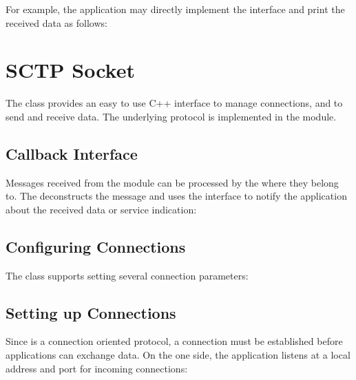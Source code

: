 For example, the application may directly implement the
 interface and print the received data as
follows:


\section{SCTP Socket}
\label{sec:sockets:sctp-socket}

The  class provides an easy to use C++ interface to manage
 connections, and to send and receive data. The underlying
 protocol is implemented in the  module.

\subsection*{Callback Interface}

Messages received from the  module can be processed by the
 where they belong to. The 
deconstructs the message and uses the  interface
to notify the application about the received data or service indication:


\subsection*{Configuring Connections}

The  class supports setting several 
connection parameters:


\subsection*{Setting up Connections}

Since  is a connection oriented protocol, a connection must be
established before applications can exchange data. On the one side, the
application listens at a local address and port for incoming 
connections:


